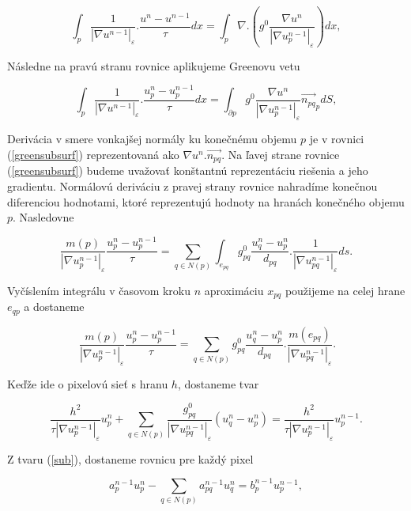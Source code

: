 \documentclass[a4paper,12pt,twoside]{article}%
\def\epsilon{\varepsilon}
\begin{document}
\begin{equation}
\int_{p}\frac{1}{|\nabla u^{n-1}|_{\epsilon}}.\frac{u^n-u^{n-1}}{\tau}dx = \int_{p}\nabla.(g^0\frac{\nabla u^n}{|\nabla u_p^{n-1}|_{\epsilon}})dx,
\end{equation}

Následne na pravú stranu rovnice aplikujeme Greenovu vetu

\begin{equation} \label{greensubsurf}
\int_{p}\frac{1}{|\nabla u^{n-1}|_{\epsilon}}.\frac{u_p^n-u_p^{n-1}}{\tau}dx = \int_{\partial p} g^0\frac{\nabla u^n}{|\nabla u_p^{n-1}|_{\epsilon}}\vec{n_{pq}}_pdS,
\end{equation}

Derivácia v smere vonkajšej normály ku konečnému objemu $p$ je v rovnici (\ref{greensubsurf}) reprezentovaná ako $\nabla u^n.\vec{n_{pq}}$. Na ľavej strane rovnice (\ref{greensubsurf}) budeme uvažovať konštantnú reprezentáciu riešenia a jeho gradientu. Normálovú deriváciu z pravej strany rovnice nahradíme konečnou diferenciou hodnotami, ktoré reprezentujú hodnoty na hranách konečného objemu $p$. Nasledovne

\begin{equation}
\frac{m(p)}{|\nabla u_p^{n-1}|_{\epsilon}}\frac{u_p^n-u_p^{n-1}}{\tau} = \sum_{q \in N(p)}\int_{e_{pq}}g_{pq}^0\frac{u_q^n - u_p^n}{d_{pq}}.\frac{1}{|\nabla u_{pq}^{n-1}|_{\epsilon}}ds.
\end{equation}

Vyčíslením integrálu v časovom kroku $n$ aproximáciu $x_{pq}$ použijeme na celej hrane $e_{qp}$ a dostaneme

\begin{equation} \
\frac{m(p)}{|\nabla u_p^{n-1}|_{\epsilon}}\frac{u_p^n-u_p^{n-1}}{\tau} = \sum_{q \in N(p)}g_{pq}^0\frac{u_q^n - u_p^n}{d_{pq}}.\frac{m(e_{pq})}{|\nabla u_{pq}^{n-1}|_{\epsilon}}.
\end{equation}

Keďže ide o pixelovú sieť s hranu $h$, dostaneme tvar

\begin{equation} \label{sub}
\frac{h^2}{\tau|\nabla u_p^{n-1}|_{\epsilon}}u_p^n + \sum_{q \in N(p)}\frac{g_{pq}^0}{|\nabla u_{pq}^{n-1}|_{\epsilon}}(u_q^n - u_p^n) = \frac{h^2}{\tau|\nabla u_p^{n-1}|_{\epsilon}}u_p^{n - 1}.
\end{equation}

Z tvaru (\ref{sub}), dostaneme rovnicu pre každý pixel

\begin{equation}
a_p^{n - 1}u_p^n - \sum_{q \in N(p)} a_{pq}^{n - 1}u_q^n =b_p^{n-1}u_p^{n-1},
\end{equation}
\end{document}
